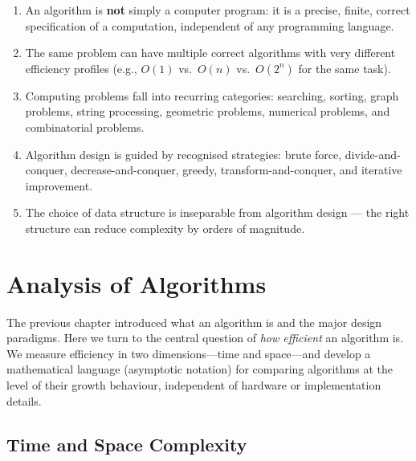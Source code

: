\documentclass[11pt, a4paper, notitlepage]{report}
\theoremstyle{definition}
\theoremstyle{remark}
\theoremstyle{definition}
\begin{document}
\begin{keyresult}[title={Chapter Summary}]
\begin{enumerate}
  \item An algorithm is \textbf{not} simply a computer program: it is a precise, finite,
        correct specification of a computation, independent of any programming language.
  \item The same problem can have multiple correct algorithms with very different efficiency
        profiles (e.g., $O(1)$ vs.\ $O(n)$ vs.\ $O(2^n)$ for the same task).
  \item Computing problems fall into recurring categories: searching, sorting, graph problems,
        string processing, geometric problems, numerical problems, and combinatorial problems.
  \item Algorithm design is guided by recognised strategies: brute force, divide-and-conquer,
        decrease-and-conquer, greedy, transform-and-conquer, and iterative improvement.
  \item The choice of data structure is inseparable from algorithm design --- the right
        structure can reduce complexity by orders of magnitude.
\end{enumerate}
\end{keyresult}

\chapter{Analysis of Algorithms}
\label{ch:analysis-of-algorithms}

The previous chapter introduced what an algorithm is and the major design paradigms.
Here we turn to the central question of \emph{how efficient} an algorithm is.
We measure efficiency in two dimensions---time and space---and develop a mathematical
language (asymptotic notation) for comparing algorithms at the level of their growth
behaviour, independent of hardware or implementation details.

\section{Time and Space Complexity}
\label{sec:time-space-complexity}
\end{document}
